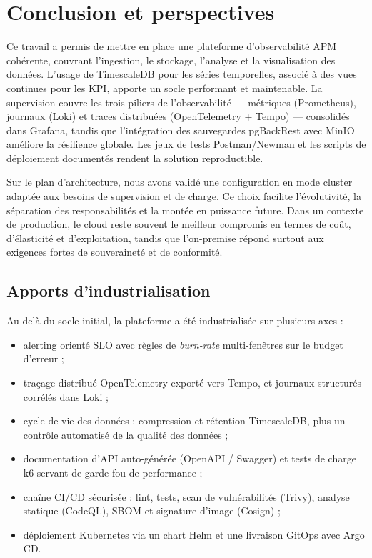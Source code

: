\section{Conclusion et perspectives}

Ce travail a permis de mettre en place une plateforme d’observabilité APM cohérente, couvrant l’ingestion, le stockage, l’analyse et la visualisation des données. L’usage de TimescaleDB pour les séries temporelles, associé à des vues continues pour les KPI, apporte un socle performant et maintenable. La supervision couvre les trois piliers de l’observabilité --- métriques (Prometheus), journaux (Loki) et traces distribuées (OpenTelemetry + Tempo) --- consolidés dans Grafana, tandis que l’intégration des sauvegardes pgBackRest avec MinIO améliore la résilience globale. Les jeux de tests Postman/Newman et les scripts de déploiement documentés rendent la solution reproductible.

Sur le plan d’architecture, nous avons validé une configuration en mode cluster adaptée aux besoins de supervision et de charge. Ce choix facilite l’évolutivité, la séparation des responsabilités et la montée en puissance future. Dans un contexte de production, le cloud reste souvent le meilleur compromis en termes de coût, d’élasticité et d’exploitation, tandis que l’on-premise répond surtout aux exigences fortes de souveraineté et de conformité.

\subsection*{Apports d'industrialisation}
Au-delà du socle initial, la plateforme a été industrialisée sur plusieurs axes :
\begin{itemize}
    \item alerting orienté SLO avec règles de \emph{burn-rate} multi-fenêtres sur le budget d’erreur ;
    \item traçage distribué OpenTelemetry exporté vers Tempo, et journaux structurés corrélés dans Loki ;
    \item cycle de vie des données : compression et rétention TimescaleDB, plus un contrôle automatisé de la qualité des données ;
    \item documentation d’API auto-générée (OpenAPI / Swagger) et tests de charge k6 servant de garde-fou de performance ;
    \item chaîne CI/CD sécurisée : lint, tests, scan de vulnérabilités (Trivy), analyse statique (CodeQL), SBOM et signature d’image (Cosign) ;
    \item déploiement Kubernetes via un chart Helm et une livraison GitOps avec Argo CD.
\end{itemize}

